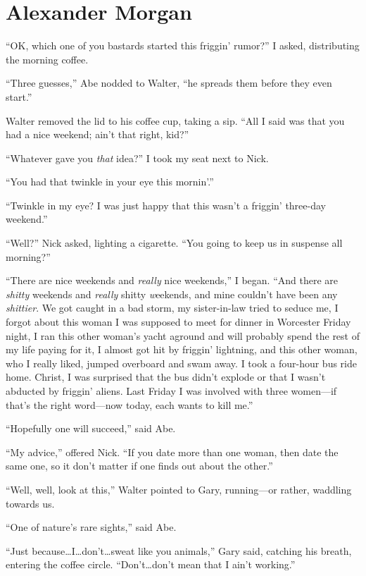 \chapter{Alexander Morgan}

\titlemark

``OK, which one of you bastards started this friggin' rumor?'' I asked,
distributing the morning coffee.

``Three guesses,'' Abe nodded to Walter, ``he spreads them before they
even start.''

Walter removed the lid to his coffee cup, taking a sip. ``All I said was
that you had a nice weekend; ain't that right, kid?''

``Whatever gave you \emph{that} idea?'' I took my seat next to Nick.

``You had that twinkle in your eye this mornin'.''

``Twinkle in my eye? I was just happy that this wasn't a friggin'
three-day weekend.''

``Well?'' Nick asked, lighting a cigarette. ``You going to keep us in
suspense all morning?''

``There are nice weekends and \emph{really} nice weekends,'' I began.
``And there are \emph{shitty} weekends and \emph{really} shitty
\emph{w}eekends, and mine couldn't have been any \emph{shittier}. We got
caught in a bad storm, my sister-in-law tried to seduce me, I forgot
about this woman I was supposed to meet for dinner in Worcester Friday
night, I ran this other woman's yacht aground and will probably spend
the rest of my life paying for it, I almost got hit by friggin'
lightning, and this other woman, who I really liked, jumped overboard
and swam away. I took a four-hour bus ride home. Christ, I was surprised
that the bus didn't explode or that I wasn't abducted by friggin'
aliens. Last Friday I was involved with three women---if that's the
right word---now today, each wants to kill me.''

``Hopefully one will succeed,'' said Abe.

``My advice,'' offered Nick. ``If you date more than one woman, then
date the same one, so it don't matter if one finds out about the
other.''

``Well, well, look at this,'' Walter pointed to Gary, running---or
rather, waddling towards us.

``One of nature's rare sights,'' said Abe.

``Just because\ldots I\ldots don't\ldots sweat like you animals,'' Gary
said, catching his breath, entering the coffee circle.
``Don't\ldots don't mean that I ain't working.''

